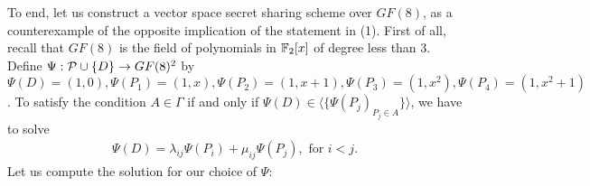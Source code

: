To end, let us construct a vector space secret sharing scheme over $GF(8)$, as a counterexample of the opposite implication of the statement in (1).
First of all, recall that $GF(8)$ is the field of polynomials in $\F_2[x]$ of degree less than 3.
Define $\Psi : \P\cup\{D\} \to GF(8)^2$ by $\Psi(D) = (1, 0), \Psi(P_1) = (1, x), \Psi(P_2) = (1, x+1), \Psi(P_3) = (1, x^2), \Psi(P_4) = (1, x^2+1)$.
To satisfy the condition $A\in\Gamma$ if and only if $\Psi(D)\in\langle \{\Psi(P_j)_{P_j\in A}\}\rangle$, we have to solve
\begin{equation*}
    \begin{split}
        \Psi(D) = \lambda_{ij}\Psi(P_i) + \mu_{ij}\Psi(P_j), \text{ for } i < j.
    \end{split}
\end{equation*}
Let us compute the solution for our choice of $\Psi$:
